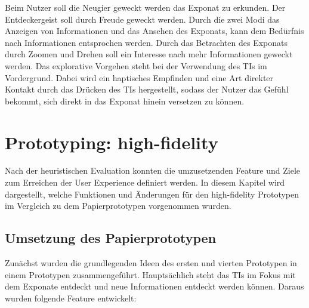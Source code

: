 \documentclass[runningheads,a4paper, 12pt]{llncs}
\begin{document}
Beim Nutzer soll die Neugier geweckt werden das Exponat zu erkunden. Der Entdeckergeist soll durch Freude geweckt werden. Durch die zwei Modi das Anzeigen von Informationen und das Ansehen des Exponats, kann dem Bedürfnis nach Informationen entsprochen werden. Durch das Betrachten des Exponats durch Zoomen und Drehen soll ein Interesse nach mehr Informationen geweckt werden. Das explorative Vorgehen steht bei der Verwendung des TIs im Vordergrund. Dabei wird ein haptisches Empfinden und eine Art direkter Kontakt durch das Drücken des TIs hergestellt, sodass der Nutzer das Gefühl bekommt, sich direkt in das Exponat hinein versetzen zu können.\\

\section{Prototyping: high-fidelity}
Nach der heuristischen Evaluation konnten die umzusetzenden Feature und Ziele zum Erreichen der User Experience definiert werden. In diesem Kapitel wird dargestellt, welche Funktionen und Änderungen für den high-fidelity Prototypen im Vergleich zu dem Papierprototypen vorgenommen wurden.\\

\subsection{Umsetzung des Papierprototypen}
Zunächst wurden die grundlegenden Ideen des ersten und vierten Prototypen in einem Prototypen zusammengeführt. Hauptsächlich steht das TIs im Fokus mit dem Exponate entdeckt und neue Informationen entdeckt werden können. Daraus wurden folgende Feature entwickelt:
\end{document}
